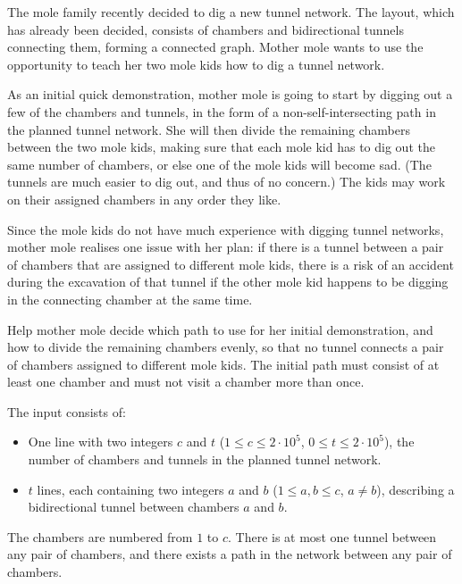 \providecommand{\maxv}{}
\renewcommand{\maxv}{2 \cdot 10^5}
\providecommand{\maxe}{}
\renewcommand{\maxe}{2 \cdot 10^5}
%
The mole family recently decided to dig a new tunnel network. The layout,
which has already been decided, consists of chambers and bidirectional
tunnels connecting them, forming a connected graph. Mother mole wants to use
the opportunity to teach her two mole kids how to dig a tunnel network.

As an initial quick demonstration, mother mole is going to start by digging out a few
of the chambers and tunnels, in the form of a non-self-intersecting path in the
planned tunnel network. She will then divide the remaining chambers
between the two mole kids, making sure that each mole kid has to dig out the same
number of chambers, or else one of the mole kids will become sad. (The tunnels
are much easier to dig out, and thus of no concern.) The kids may work on their
assigned chambers in any order they like.

Since the mole kids do not have much experience with digging tunnel networks,
mother mole realises one issue with her plan: if there is a tunnel between a pair
of chambers that are assigned to different mole kids, there is a risk of an
accident during the excavation of that tunnel if the other mole kid happens to
be digging in the connecting chamber at the same time.

Help mother mole decide which path to use for her initial demonstration, and
how to divide the remaining chambers evenly, so that no tunnel connects a pair
of chambers assigned to different mole kids. The initial path must consist of
at least one chamber and must not visit a chamber more than once.

\begin{Input}
The input consists of:
\begin{itemize}
\item One line with two integers $c$ and $t$ ($1 \leq c \leq \maxv$, $0 \leq t \leq \maxe$),
    the number of chambers and tunnels in the planned tunnel network.
\item $t$ lines, each containing two integers $a$ and $b$ ($1 \leq a,b \leq c$,
    $a \neq b$), describing a bidirectional tunnel between chambers $a$ and $b$.
\end{itemize}

The chambers are numbered from $1$ to $c$. There is at most one tunnel between
any pair of chambers, and there exists a path in the network between any pair
of chambers.
\end{Input}

